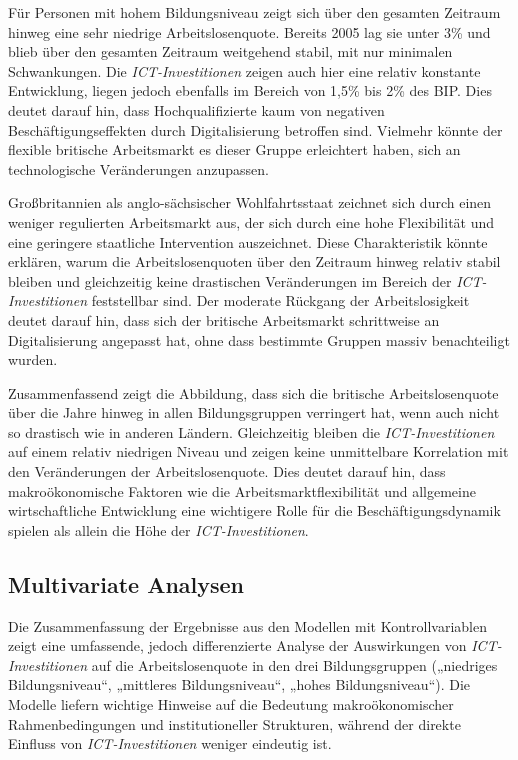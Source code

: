 Für Personen mit hohem Bildungsniveau zeigt sich über den gesamten Zeitraum hinweg eine 
sehr niedrige Arbeitslosenquote. Bereits 2005 lag sie unter 3\% und blieb über den 
gesamten Zeitraum weitgehend stabil, mit nur minimalen Schwankungen. Die 
\textit{\ac{ICT}-Investitionen} zeigen auch hier eine relativ konstante Entwicklung, 
liegen jedoch ebenfalls im Bereich von 1,5\% bis 2\% des BIP. Dies deutet darauf hin, 
dass Hochqualifizierte kaum von negativen Beschäftigungseffekten durch Digitalisierung 
betroffen sind. Vielmehr könnte der flexible britische Arbeitsmarkt es dieser Gruppe 
erleichtert haben, sich an technologische Veränderungen anzupassen.

Großbritannien als anglo-sächsischer Wohlfahrtsstaat zeichnet sich durch einen 
weniger regulierten Arbeitsmarkt aus, der sich durch eine hohe Flexibilität und eine 
geringere staatliche Intervention auszeichnet. Diese Charakteristik könnte erklären, 
warum die Arbeitslosenquoten über den Zeitraum hinweg relativ stabil bleiben und 
gleichzeitig keine drastischen Veränderungen im Bereich der \textit{\ac{ICT}-Investitionen} 
feststellbar sind. Der moderate Rückgang der Arbeitslosigkeit deutet darauf hin, dass sich 
der britische Arbeitsmarkt schrittweise an Digitalisierung angepasst hat, ohne dass 
bestimmte Gruppen massiv benachteiligt wurden. %

Zusammenfassend zeigt die Abbildung, dass sich die britische Arbeitslosenquote über die 
Jahre hinweg in allen Bildungsgruppen verringert hat, wenn auch nicht so drastisch wie in 
anderen Ländern. Gleichzeitig bleiben die \textit{\ac{ICT}-Investitionen} auf einem 
relativ niedrigen Niveau und zeigen keine unmittelbare Korrelation mit den Veränderungen 
der Arbeitslosenquote. Dies deutet darauf hin, dass makroökonomische Faktoren wie die 
Arbeitsmarktflexibilität und allgemeine wirtschaftliche Entwicklung eine wichtigere Rolle 
für die Beschäftigungsdynamik spielen als allein die Höhe der \textit{\ac{ICT}-Investitionen}.



\subsection{Multivariate Analysen}

Die Zusammenfassung der Ergebnisse aus den Modellen mit Kontrollvariablen zeigt eine 
umfassende, jedoch differenzierte Analyse der Auswirkungen von 
\textit{\ac{ICT}-Investitionen} auf die Arbeitslosenquote in den drei Bildungsgruppen 
(„niedriges Bildungsniveau“, „mittleres Bildungsniveau“, „hohes Bildungsniveau“). Die 
Modelle liefern wichtige Hinweise auf die Bedeutung makroökonomischer Rahmenbedingungen 
und institutioneller Strukturen, während der direkte Einfluss von 
\textit{\ac{ICT}-Investitionen} weniger eindeutig ist.

